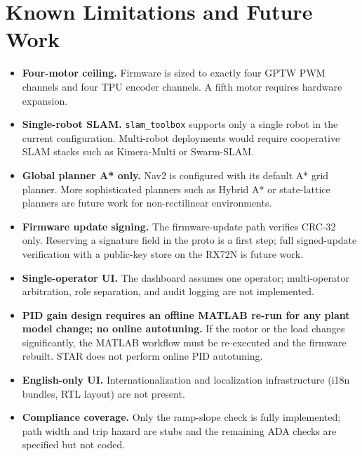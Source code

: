 \documentclass[11pt,letterpaper]{article}
\begin{document}
\section{Known Limitations and Future Work}
\label{sec:limitations}

\begin{itemize}[leftmargin=1.4em,itemsep=2pt]
\item \textbf{Four-motor ceiling.} Firmware is sized to exactly four
      GPTW PWM channels and four TPU encoder channels. A fifth motor
      requires hardware expansion.
\item \textbf{Single-robot SLAM.} \texttt{slam\_toolbox} supports only
      a single robot in the current configuration. Multi-robot
      deployments would require cooperative SLAM stacks such as
      Kimera-Multi or Swarm-SLAM.
\item \textbf{Global planner A* only.} Nav2 is configured with its
      default A* grid planner. More sophisticated planners such as
      Hybrid A* or state-lattice planners are future work for
      non-rectilinear environments.
\item \textbf{Firmware update signing.} The firmware-update path
      verifies CRC-32 only. Reserving a signature field in the proto
      is a first step; full signed-update verification with a
      public-key store on the RX72N is future work.
\item \textbf{Single-operator UI.} The dashboard assumes one
      operator; multi-operator arbitration, role separation, and
      audit logging are not implemented.
\item \textbf{PID gain design requires an offline MATLAB re-run for
      any plant model change; no online autotuning.} If the motor
      or the load changes significantly, the MATLAB workflow must be
      re-executed and the firmware rebuilt. STAR does not perform
      online PID autotuning.
\item \textbf{English-only UI.} Internationalization and
      localization infrastructure (i18n bundles, RTL layout) are not
      present.
\item \textbf{Compliance coverage.} Only the ramp-slope check is
      fully implemented; path width and trip hazard are stubs and
      the remaining ADA checks are specified but not coded.
\end{itemize}

\end{document}
